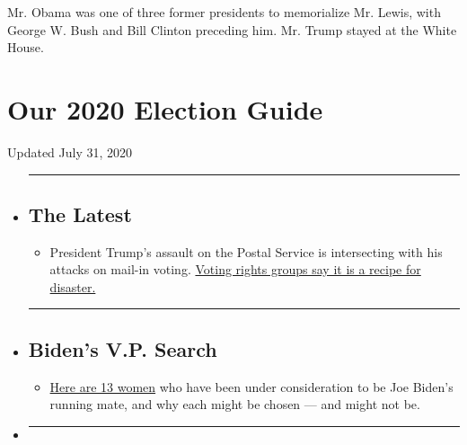 Mr. Obama was one of three former presidents to memorialize Mr. Lewis,
with George W. Bush and Bill Clinton preceding him. Mr. Trump stayed at
the White House.

\hypertarget{our-2020-election-guide}{%
\section{Our 2020 Election Guide}\label{our-2020-election-guide}}

Updated July 31, 2020

\begin{itemize}
\item
  \begin{center}\rule{0.5\linewidth}{\linethickness}\end{center}

  \hypertarget{the-latest}{%
  \subsection{The Latest}\label{the-latest}}

  \begin{itemize}
  \tightlist
  \item
    President Trump's assault on the Postal Service is intersecting with
    his attacks on mail-in voting.
    \href{https://www.nytimes.com/2020/07/31/us/politics/trump-usps-mail-delays.html?action=click\&pgtype=Article\&state=default\&region=BELOW_MAIN_CONTENT\&context=storylines_guide}{Voting
    rights groups say it is a recipe for disaster.}
  \end{itemize}
\item
  \begin{center}\rule{0.5\linewidth}{\linethickness}\end{center}

  \hypertarget{bidens-vp-search}{%
  \subsection{Biden's V.P. Search}\label{bidens-vp-search}}

  \begin{itemize}
  \tightlist
  \item
    \href{https://www.nytimes.com/article/biden-vice-president-2020.html?action=click\&pgtype=Article\&state=default\&region=BELOW_MAIN_CONTENT\&context=storylines_guide}{Here
    are 13 women} who have been under consideration to be Joe Biden's
    running mate, and why each might be chosen --- and might not be.
  \end{itemize}
\item
  \begin{center}\rule{0.5\linewidth}{\linethickness}\end{center}


\end{itemize}
